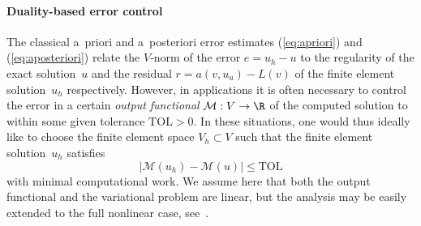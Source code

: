 \paragraph{Duality-based error control}

The classical a~priori and a~posteriori error estimates
(\ref{eq:apriori}) and (\ref{eq:aposteriori}) relate the $V$-norm of
the error $e = u_h - u$ to the regularity of the exact solution~$u$
and the residual $r = a(v, u_u) - L(v)$ of the finite element
solution~$u_h$ respectively. However, in applications it is often
necessary to control the error in a certain \emph{output functional}
$\mathcal{M} : V \rightarrow \R$ of the computed solution to within
some given tolerance $\mathrm{TOL} > 0$. In these situations, one
would thus ideally like to choose the finite element space $V_h
\subset V$ such that the finite element solution~$u_h$ satisfies
\begin{equation}
  |\mathcal{M}(u_h) - \mathcal{M}(u)| \leq \mathrm{TOL}
\end{equation}
with minimal computational work. We assume here that both the output
functional and the variational problem are linear, but the analysis
may be easily extended to the full nonlinear case,
see~\cite{ErikssonEstepHansboEtAl1995,BeckerRannacher2001}.

